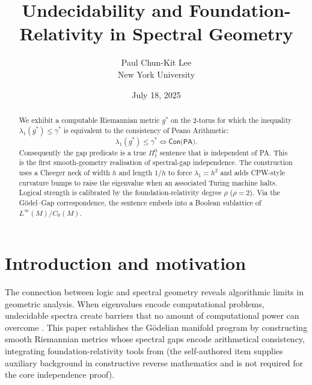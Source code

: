 \documentclass[11pt]{article}
\title{Undecidability and Foundation-Relativity in Spectral Geometry}
\author{Paul Chun-Kit Lee \\[0.3em] \small New York University}
\date{July 18, 2025}
\theoremstyle{definition}\newtheorem{definition}[theorem]{Definition}
\theoremstyle{remark}\newtheorem{remark}[theorem]{Remark}
\begin{document}
\maketitle

\begin{abstract}
We exhibit a computable Riemannian metric $g^{\ast}$ on the 2-torus for
which the inequality $\lambda_{1}(g^{\ast})\le\gamma^{\ast}$ is
equivalent to the consistency of Peano Arithmetic:
\[
    \lambda_{1}(g^{\ast})\le\gamma^{\ast} \Longleftrightarrow
    \textsf{Con(PA)} .
\]
Consequently the gap predicate is a true $\Pi^{0}_{1}$ sentence that is
independent of PA. This is the first smooth-geometry realisation of
spectral-gap independence. The construction uses a Cheeger neck of
width $h$ and length $1/h$ to force $\lambda_{1}\asymp h^{2}$ and
adds CPW-style curvature bumps to raise the eigenvalue when an
associated Turing machine halts. Logical strength is calibrated by the
foundation-relativity degree $\rho$ ($\rho=2$). Via the
Gödel–Gap correspondence, the sentence embeds into a Boolean sublattice
of $L^{\infty}(M)/C_{0}(M)$.
\end{abstract}

\tableofcontents


\section{Introduction and motivation}
\label{sec:intro}

The connection between logic and spectral geometry reveals algorithmic limits in geometric analysis. When eigenvalues encode computational problems, undecidable spectra create barriers that no amount of computational power can overcome \cite{PourElRichards1989}. This paper establishes the Gödelian manifold program by constructing smooth Riemannian metrics whose spectral gaps encode arithmetical consistency, integrating foundation-relativity tools from \cite{Lee2025Framework} (the self-authored item supplies auxiliary background in constructive reverse mathematics and is not required for the core independence proof).
\end{document}
